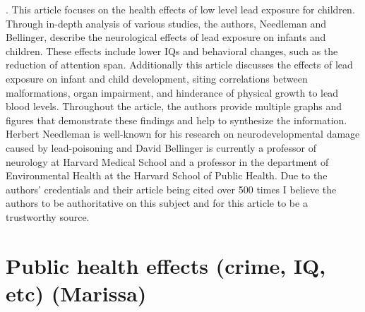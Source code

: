 \documentclass{article}\usepackage[]{graphicx}\usepackage[]{color}
\begin{document}
. 
\bigskip
This article focuses on the health effects of low level lead exposure for children. Through in-depth analysis of various studies, the authors, Needleman and Bellinger, describe the neurological effects of lead exposure on infants and children. These effects include lower IQs and behavioral changes, such as the reduction of attention span. Additionally this article discusses the effects of lead exposure on infant and child development, siting correlations between malformations, organ impairment, and hinderance of physical growth to lead blood levels. Throughout the article, the authors provide multiple graphs and figures that demonstrate these findings and help to synthesize the information. Herbert Needleman is well-known for his research on neurodevelopmental damage caused by lead-poisoning and David Bellinger is currently a professor of neurology at Harvard Medical School and a professor in the department of Environmental Health at the Harvard School of Public Health. Due to the authors’ credentials and their article being cited over 500 times I believe the authors to be authoritative on this subject and for this article to be a trustworthy source. 

\section{Public health effects (crime, IQ, etc) (Marissa)}
\end{document}
